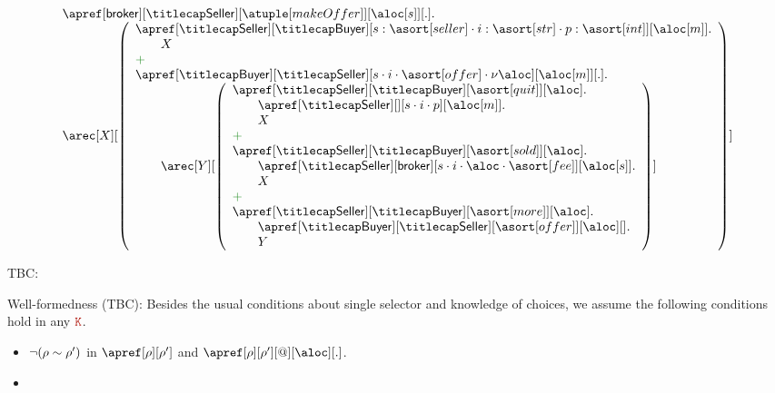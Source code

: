 \begin{example}[Auction]
\[
  \begin{array}{l}
    \apref[\ptp {broker}][\amulti {Seller}][{\atuple[makeOffer]}][{\aloc[s]}][.].
    \\  	
    \arec[X][\left({
    \begin{array}{l}
      \apref[\amulti{Seller}][\amulti {Buyer}][s:{\asort[seller]} \cdot {i:{\asort[str]} \cdot p:{\asort[int]}}][{\aloc[m]}].
      \\\qquad
      X
      \\
      \chop
      \\
      \apref[\amulti {Buyer}][\amulti {Seller}][s \cdot i \cdot {\asort[offer]} \cdot \nu \aloc][{\aloc[m]}][.].
      \\\qquad
      \arec[Y][\left({
      \begin{array}{l}
	\apref[\amulti {Seller}][\amulti {Buyer}][{\asort[quit]}][\aloc].
	\\\qquad
	\apref[\amulti {Seller}][][s \cdot i \cdot p][{\aloc[m]}].
        \\
        \qquad
        X
        \\
        \chop
	\\
        \apref[\amulti{Seller}][\amulti {Buyer}][{\asort[sold]}][\aloc].
        \\\qquad
        \apref[\amulti{Seller}][\ptp{broker}][s \cdot i \cdot \aloc \cdot {\asort[fee]}][{\aloc[s]}].        
        \\
        \qquad
        X
	\\
        \chop
	\\
        \apref[\amulti {Seller}][\amulti {Buyer}][{\asort[more]}][\aloc].
        \\
        \qquad\apref[\amulti {Buyer}][\amulti {Seller}][{\asort[offer]}][{\aloc}][].
	\\
        \qquad	
	Y
      \end{array}
      } \right)]
    \end{array}
    }\right)]
    \\
  \end{array}
\]
\finex
\end{example}

TBC: 

Well-formedness (TBC): Besides the usual conditions about single selector and knowledge of 
choices,  we assume the following conditions hold in any $\aK$.

\begin{itemize}
	\item $\neg (\rho \sim \rho')$ in $\apref[\arole][\arole']$ and $\apref[\arole][\arole'][@][\aloc][.]$.
	\item 
\end{itemize}



